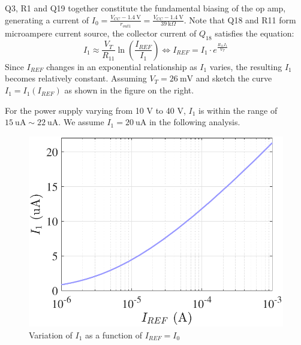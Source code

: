 \documentclass[UTF8]{article}
\begin{document}
\begin{center}
\noindent\begin{minipage}{0.49\columnwidth}
    \hspace*{1em} Q3, R1 and Q19 together constitute the fundamental biasing of the op amp, generating a current of $I_0 = \frac{V_{CC} - 1.4 \ \mathrm{V}}{r_{out1}} = \frac{V_{CC} - 1.4 \ \mathrm{V}}{39 \ \mathrm{k}\Omega}$. Note that Q18 and R11 form microampere current source, the collector current of $Q_{18}$ satisfies the equation:
    \begin{equation}
        I_1 \approx \frac{V_T}{R_{11}} \ln \left(\frac{I_{REF}}{I_1}\right) \Longleftrightarrow I_{REF} = I_1 \cdot e^{\frac{R_{11}I_1}{V_T}}
    \end{equation}
    \hspace*{1em} Since $I_{REF}$ changes in an exponential relationship as $I_1$ varies, the resulting $I_1$ becomes relatively constant. Assuming $V_T = 26\ \mathrm{mV}$ and sketch the curve $I_1 = I_1 (I_{REF})$ as shown in the figure on the right.

    \hspace*{1em} For the power supply varying from 10 V to 40 V, $I_1$ is within the range of $15 \ \mathrm{uA} \sim 22 \ \mathrm{uA}$. We assume $I_1 = 20 \ \mathrm{uA}$ in the following analysis.
\end{minipage}\hfill\begin{minipage}{0.49\columnwidth}
\begin{figure}[H]\centering
    \includegraphics[width=\columnwidth]{LCE-06-07-运放设计/assets/uA741/I_1.pdf}
    \caption{Variation of $I_1$ as a function of $I_{REF} = I_0$}
\end{figure}
\end{minipage}\end{center}
\end{document}
